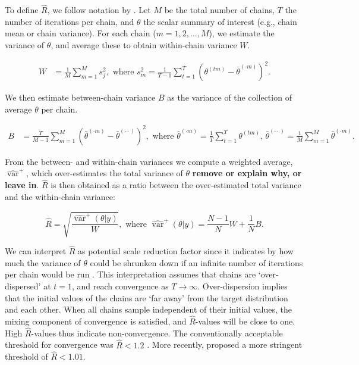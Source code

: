 \documentclass[Royal,times,sageh]{sagej}
\begin{document}
To define \(\widehat{R}\), we follow notation by \citep[p.~5]{veht19}.
Let \(M\) be the total number of chains, \(T\) the number of iterations
per chain, and \(\theta\) the scalar summary of interest (e.g., chain
mean or chain variance). For each chain (\(m = 1, 2, \dots, M\)), we
estimate the variance of \(\theta\), and average these to obtain
within-chain variance \(W\).

\begin{align*}
W&=\frac{1}{M} \sum_{m=1}^{M} s_{j}^{2}, \text { where } s_{m}^{2}=\frac{1}{T-1} \sum_{t=1}^{T}\left(\theta^{(t m)}-\bar{\theta}^{(\cdot m)}\right)^{2}. 
\end{align*}

We then estimate between-chain variance \(B\) as the variance of the
collection of average \(\theta\) per chain.

\begin{align*}
B&=\frac{T}{M-1} \sum_{m=1}^{M}\left(\bar{\theta}^{(\cdot m)}-\bar{\theta}^{(\cdot \cdot)}\right)^{2}, \text { where } \bar{\theta}^{(\cdot m)}=\frac{1}{T} \sum_{t=1}^{T} \theta^{(t m)} \text{, } \bar{\theta}^{(\cdot \cdot)}=\frac{1}{M} \sum_{m=1}^{M} \bar{\theta}^{(\cdot m)}. 
\end{align*}

From the between- and within-chain variances we compute a weighted
average, \(\widehat{\operatorname{var}}^{+}\), which over-estimates the
total variance of \(\theta\) \textbf{remove or explain why, or leave
in}. \(\widehat{R}\) is then obtained as a ratio between the
over-estimated total variance and the within-chain variance:

\begin{equation*}
\widehat{R}=\sqrt{\frac{\widehat{\operatorname{var}}^{+}(\theta | y)}{W}},
\text{ where } \widehat{\operatorname{var}}^{+}(\theta | y)=\frac{N-1}{N} W+\frac{1}{N} B.
\end{equation*}

We can interpret \(\widehat{R}\) as potential scale reduction factor
since it indicates by how much the variance of \(\theta\) could be
shrunken down if an infinite number of iterations per chain would be run
\citep{gelm92}. This interpretation assumes that chains are
`over-dispersed' at \(t=1\), and reach convergence as \(T \to \infty\).
Over-dispersion implies that the initial values of the chains are `far
away' from the target distribution and each other. When all chains
sample independent of their initial values, the mixing component of
convergence is satisfied, and \(\widehat{R}\)-values will be close to
one. High \(\widehat{R}\)-values thus indicate non-convergence. The
conventionally acceptable threshold for convergence was
\(\widehat{R} < 1.2\) \citep{gelm92}. More recently, \citet{veht19}
proposed a more stringent threshold of \(\widehat{R} < 1.01\).
\end{document}
